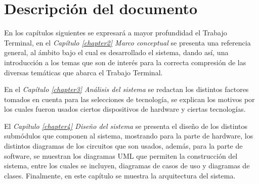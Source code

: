 \section{Descripción del documento}
En los capítulos siguientes se expresará a mayor profundidad el Trabajo Terminal, en el \textit{Capítulo \ref{chapter2} Marco conceptual} se presenta una referencia general, al ámbito bajo el cual es desarrollado el sistema, dando así, una introducción a los temas que son de interés para la correcta compresión de las diversas temáticas que abarca el Trabajo Terminal.

En el \textit{Capítulo \ref{chapter3} Análisis del sistema} se redactan los distintos factores tomados en cuenta para las selecciones de tecnología, se explican los motivos por los cuales fueron usados ciertos dispositivos de hardware y ciertas tecnologías.

El \textit{Capítulo \ref{chapter4} Diseño del sistema} se presenta el diseño de los distintos submódulos que componen al sistema, mostrando para la parte de hardware, los distintos diagramas de los circuitos que son usados, además, para la parte de software, se muestran los diagramas UML que permiten la construcción del sistema, entre los cuales se incluyen, diagramas de casos de uso y diagramas de clases. Finalmente, en este capítulo se muestra la arquitectura del sistema. %

